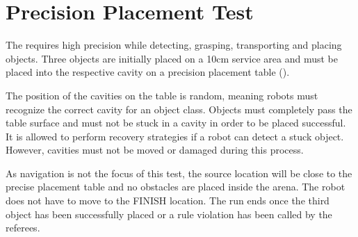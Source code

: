 \newpage
\section{Precision Placement Test}
\label{sec:Precision Placement Test}

The  requires high precision while detecting, grasping, transporting and placing objects. Three objects are initially placed on a 10cm service area and must be placed into the respective cavity on a precision placement table (). 

The position of the cavities on the table is random, meaning robots must recognize the correct cavity for an object class. Objects must completely pass the table surface and must not be stuck in a cavity in order to be placed successful. It is allowed to perform recovery strategies if a robot can detect a stuck object.
However, cavities must not be moved or damaged during this process.

As navigation is not the focus of this test, the source location will be close to the precise placement table and no obstacles are placed inside the arena. The robot does not have to move to the FINISH location. The run ends once the third object has been successfully placed or a rule violation has been called by the referees.


